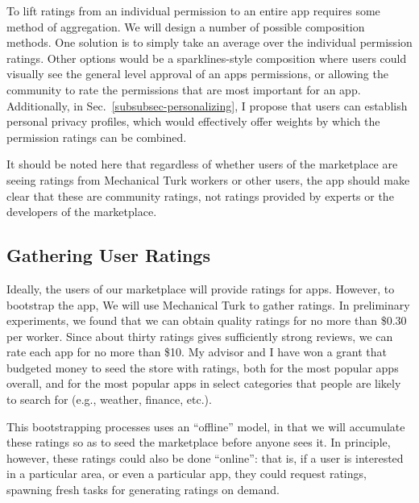 \documentclass[11pt]{article}
\begin{document}
To lift ratings from an individual permission to an entire app
requires some method of aggregation. We will design a
number of possible composition methods. One solution is to simply take
an average over the individual permission ratings. Other options would
be a sparklines-style composition where users could visually see the
general level approval of an apps permissions, or allowing the
community to rate the permissions that are most important for an app. 
Additionally, in 
Sec.~\ref{subsubsec-personalizing}, I propose that users
can establish personal privacy profiles, which would effectively offer
weights by which the permission ratings can be combined.

It should be noted here that regardless of whether users of the
marketplace are seeing ratings from Mechanical Turk workers or other
users, the app should make clear that these are community ratings, not
ratings provided by experts or the developers of the marketplace.


\subsection{Gathering User Ratings}
\label{subsec-gather-ratings}

Ideally, the users of our marketplace will provide ratings for
apps. However, 
to bootstrap the app, We will use Mechanical Turk to gather
ratings. In preliminary experiments, we found that we can obtain
quality ratings for no more than \$0.30 per worker. Since about thirty
ratings gives sufficiently strong reviews, we can rate each
app for no more than \$10. 
My advisor and I have won a grant that  budgeted money to
seed the store with ratings, both for the most popular apps overall,
and for the most popular apps in select categories that people are
likely to search for (e.g., weather, finance, etc.).

This bootstrapping processes uses an ``offline'' model, in that we 
will accumulate these ratings so as to seed the marketplace before anyone
sees it. In principle, however, these ratings could also be done
``online'': that is, if a user is interested in a particular area, or
even a particular app, they could request ratings, spawning fresh tasks for
generating ratings on demand. 
\end{document}
